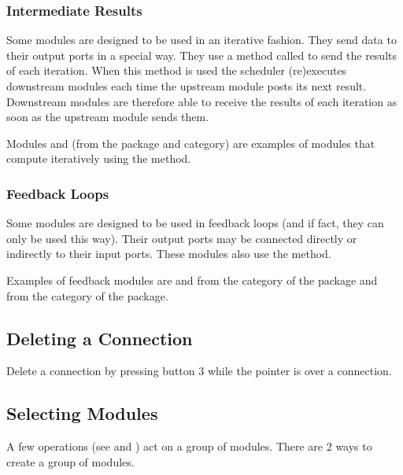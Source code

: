 \subsubsection{Intermediate Results}

Some modules are designed to be used in an iterative fashion.  They send
data to their output ports in a special way.  They use a method called
 to send the results of each iteration.  When
this method is used the scheduler (re)executes downstream modules each time
the upstream module posts its next result.  Downstream modules are
therefore able to receive the results of each iteration as soon as the
upstream module sends them.

Modules  and  (from the
\package{\sr} package and  category) are examples of modules
that compute iteratively using the  method.

\subsubsection{Feedback Loops}

Some modules are designed to be used in feedback loops (and if fact,
they can only be used this way).  Their output ports may be connected
directly or indirectly to their input ports.  These modules also use the
 method.

Examples of feedback modules are  and
 from the  category of the
 package and  from the
 category of the  package.

\subsection{Deleting a Connection}
\label{sec:deleteconnections}

Delete a connection by pressing button 3 while the pointer is
over a connection.

\subsection{Selecting Modules}
\label{sec:selectmods}

A few operations (see  and
) act on a group of
modules.  There are 2 ways to create a group of modules.

